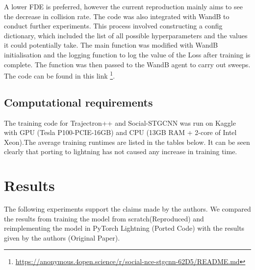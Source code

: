 A lower FDE is preferred, however the current reproduction mainly aims to see the decrease in collision rate. 
The code was also integrated with WandB to conduct further experiments. This process involved constructing a config dictionary, which included the list of all possible hyperparameters and the values it could potentially take. The main function was modified with WandB initialisation and the logging function to log the value of the Loss after training is complete. The function was then passed to the WandB agent to carry out sweeps. The code can be found in this link \footnote{\href{https://anonymous.4open.science/r/social-nce-stgcnn-62D5/README.md}{https://anonymous.4open.science/r/social-nce-stgcnn-62D5/README.md}}.
\subsection{Computational requirements}
The training code for Trajectron++ and Social-STGCNN was run on Kaggle with GPU (Tesla P100-PCIE-16GB) and CPU (13GB RAM + 2-core of Intel Xeon).The average training runtimes are listed in the tables below. It can be seen clearly that porting to lightning has not caused any increase in training time. 

\begin{table}[H]
\caption{Training Runtimes} %
\centering %
\label{tab:hresult}
\end{table}


\section{Results}
\label{sec:results}
The following experiments support the claims made by the authors. We compared the results from training the model from scratch(Reproduced) and reimplementing the model in PyTorch Lightning (Ported Code) with the results given by the authors (Original Paper).

